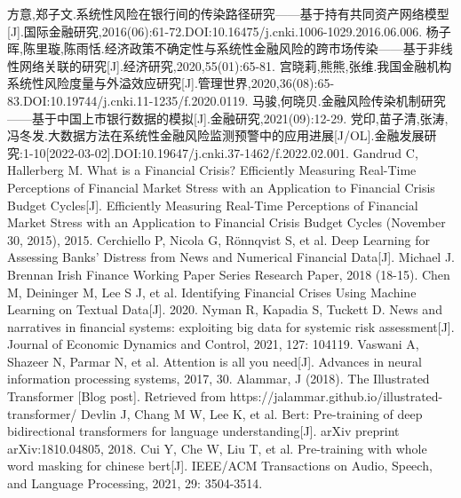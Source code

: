 \documentclass[lang=cn]{elegantpaper}
\begin{document}
\begin{thebibliography}{99}
    方意,郑子文.系统性风险在银行间的传染路径研究——基于持有共同资产网络模型[J].国际金融研究,2016(06):61-72.DOI:10.16475/j.cnki.1006-1029.2016.06.006.
    杨子晖,陈里璇,陈雨恬.经济政策不确定性与系统性金融风险的跨市场传染——基于非线性网络关联的研究[J].经济研究,2020,55(01):65-81.
    宫晓莉,熊熊,张维.我国金融机构系统性风险度量与外溢效应研究[J].管理世界,2020,36(08):65-83.DOI:10.19744/j.cnki.11-1235/f.2020.0119.
    马骏,何晓贝.金融风险传染机制研究——基于中国上市银行数据的模拟[J].金融研究,2021(09):12-29.
    党印,苗子清,张涛,冯冬发.大数据方法在系统性金融风险监测预警中的应用进展[J/OL].金融发展研究:1-10[2022-03-02].DOI:10.19647/j.cnki.37-1462/f.2022.02.001.
    Gandrud C, Hallerberg M. What is a Financial Crisis? Efficiently Measuring Real-Time Perceptions of Financial Market Stress with an Application to Financial Crisis Budget Cycles[J]. Efficiently Measuring Real-Time Perceptions of Financial Market Stress with an Application to Financial Crisis Budget Cycles (November 30, 2015), 2015.
    Cerchiello P, Nicola G, Rönnqvist S, et al. Deep Learning for Assessing Banks' Distress from News and Numerical Financial Data[J]. Michael J. Brennan Irish Finance Working Paper Series Research Paper, 2018 (18-15).
    Chen M, Deininger M, Lee S J, et al. Identifying Financial Crises Using Machine Learning on Textual Data[J]. 2020.
    Nyman R, Kapadia S, Tuckett D. News and narratives in financial systems: exploiting big data for systemic risk assessment[J]. Journal of Economic Dynamics and Control, 2021, 127: 104119.
    Vaswani A, Shazeer N, Parmar N, et al. Attention is all you need[J]. Advances in neural information processing systems, 2017, 30.
    Alammar, J (2018). The Illustrated Transformer [Blog post]. Retrieved from https://jalammar.github.io/illustrated-transformer/
    Devlin J, Chang M W, Lee K, et al. Bert: Pre-training of deep bidirectional transformers for language understanding[J]. arXiv preprint arXiv:1810.04805, 2018.
    Cui Y, Che W, Liu T, et al. Pre-training with whole word masking for chinese bert[J]. IEEE/ACM Transactions on Audio, Speech, and Language Processing, 2021, 29: 3504-3514.
\end{thebibliography}
\end{document}
